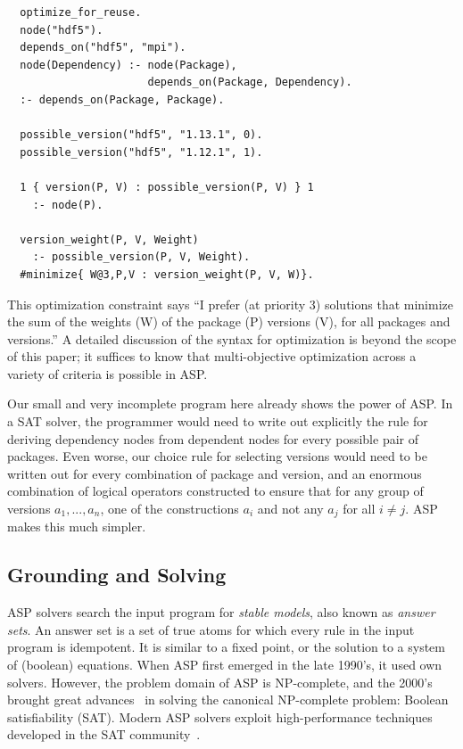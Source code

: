 \begin{verbatim}
  optimize_for_reuse.
  node("hdf5").
  depends_on("hdf5", "mpi").
  node(Dependency) :- node(Package),
                      depends_on(Package, Dependency).
  :- depends_on(Package, Package).

  possible_version("hdf5", "1.13.1", 0).
  possible_version("hdf5", "1.12.1", 1).

  1 { version(P, V) : possible_version(P, V) } 1
    :- node(P).

  version_weight(P, V, Weight)
    :- possible_version(P, V, Weight).
  #minimize{ W@3,P,V : version_weight(P, V, W)}.
\end{verbatim}

This optimization constraint says ``I prefer (at priority 3) solutions that minimize the
sum of the weights (W) of the package (P) versions (V), for all packages and versions.''
A detailed discussion of the syntax for optimization is beyond the scope of this paper;
it suffices to know that multi-objective optimization across a variety of criteria is
possible in ASP.

Our small and very incomplete program here already shows the power of ASP. In a SAT
solver, the programmer would need to write out explicitly the rule for deriving
dependency nodes from dependent nodes for every possible pair of packages. Even worse,
our choice rule for selecting versions would need to be written out for every
combination of package and version, and an enormous combination of logical operators
constructed to ensure that for any group of versions \texttt{$a_1, ..., a_n$}, one of
the constructions \texttt{$a_i$} and not any \texttt{$a_j$} for all $i\neq{j}$. ASP
makes this much simpler.


\subsection{Grounding and Solving}

ASP solvers search the input program for {\it stable models}, also known as
\textit{answer sets}. An answer set is a set of true atoms for which every rule in the
input program is idempotent. It is similar to a fixed point, or the solution to a system
of (boolean) equations. When ASP first emerged in the late 1990's, it used own solvers.
However, the problem domain of ASP is NP-complete, and the 2000's brought great
advances~\cite{moskewicz2001chaff} in solving the canonical NP-complete problem: Boolean
satisfiability (SAT). Modern ASP solvers exploit high-performance techniques developed
in the SAT community~\cite{gebser+:asp-book}.

